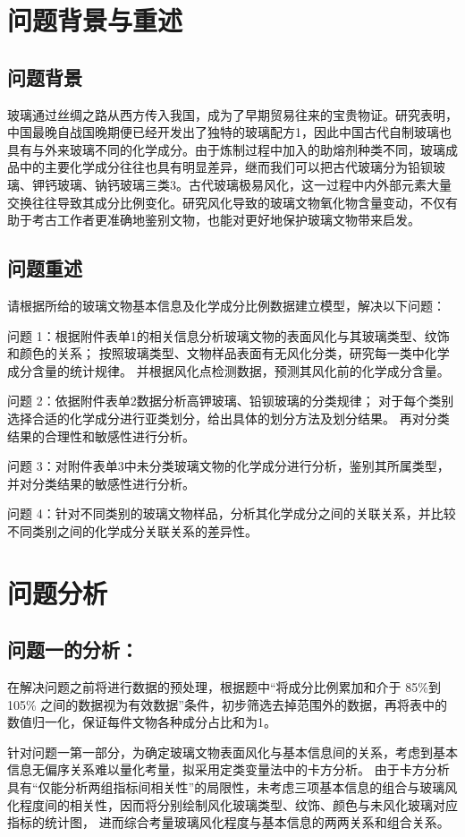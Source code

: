 \documentclass[withoutpreface,bwprint]{cumcmthesis}
\begin{document}
\section{问题背景与重述}
\subsection{问题背景}
玻璃通过丝绸之路从西方传入我国，成为了早期贸易往来的宝贵物证。研究表明，中国最晚自战国晚期便已经开发出了独特的玻璃配方{1}，因此中国古代自制玻璃也具有与外来玻璃不同的化学成分。由于炼制过程中加入的助熔剂种类不同，玻璃成品中的主要化学成分往往也具有明显差异，继而我们可以把古代玻璃分为铅钡玻璃、钾钙玻璃、钠钙玻璃三类{3}。古代玻璃极易风化，这一过程中内外部元素大量交换往往导致其成分比例变化。研究风化导致的玻璃文物氧化物含量变动，不仅有助于考古工作者更准确地鉴别文物，也能对更好地保护玻璃文物带来启发。

\subsection{问题重述}
请根据所给的玻璃文物基本信息及化学成分比例数据建立模型，解决以下问题：

问题 1：根据附件表单1的相关信息分析玻璃文物的表面风化与其玻璃类型、纹饰和颜色的关系；
按照玻璃类型、文物样品表面有无风化分类，研究每一类中化学成分含量的统计规律。
并根据风化点检测数据，预测其风化前的化学成分含量。

问题 2：依据附件表单2数据分析高钾玻璃、铅钡玻璃的分类规律；
对于每个类别选择合适的化学成分进行亚类划分，给出具体的划分方法及划分结果。
再对分类结果的合理性和敏感性进行分析。

问题 3：对附件表单3中未分类玻璃文物的化学成分进行分析，鉴别其所属类型，并对分类结果的敏感性进行分析。

问题 4：针对不同类别的玻璃文物样品，分析其化学成分之间的关联关系，并比较不同类别之间的化学成分关联关系的差异性。
\section{问题分析}
\subsection{问题一的分析：}
在解决问题之前将进行数据的预处理，根据题中“将成分比例累加和介于
85\%到105\%
之间的数据视为有效数据”条件，初步筛选去掉范围外的数据，再将表中的数值归一化，保证每件文物各种成分占比和为1。

针对问题一第一部分，为确定玻璃文物表面风化与基本信息间的关系，考虑到基本信息无偏序关系难以量化考量，拟采用定类变量法中的卡方分析。
由于卡方分析具有“仅能分析两组指标间相关性”的局限性，未考虑三项基本信息的组合与玻璃风化程度间的相关性，因而将分别绘制风化玻璃类型、纹饰、颜色与未风化玻璃对应指标的统计图，
进而综合考量玻璃风化程度与基本信息的两两关系和组合关系。
\end{document}
